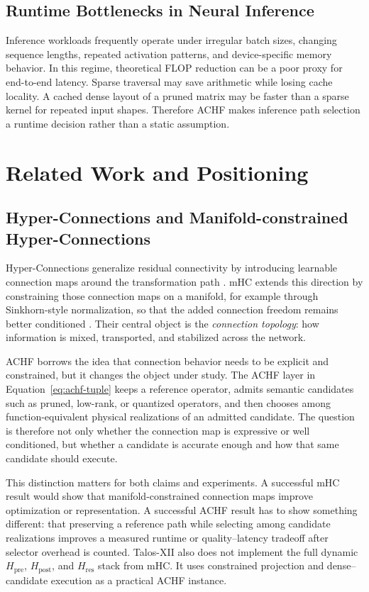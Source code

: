 \documentclass{article}
\newcommand{\achf}{\textsc{ACHF}}
\begin{document}
\subsection{Runtime Bottlenecks in Neural Inference}

Inference workloads frequently operate under irregular batch sizes, changing
sequence lengths, repeated activation patterns, and device-specific memory
behavior. In this regime, theoretical FLOP reduction can be a poor proxy for
end-to-end latency. Sparse traversal may save arithmetic while losing cache
locality. A cached dense layout of a pruned matrix may be faster than a sparse
kernel for repeated input shapes. Therefore \achf{} makes inference path
selection a runtime decision rather than a static assumption.

\section{Related Work and Positioning}
\label{sec:related}

\subsection{Hyper-Connections and Manifold-constrained Hyper-Connections}

Hyper-Connections generalize residual connectivity by introducing learnable
connection maps around the transformation path \cite{hyperconnections2024}.
mHC extends this direction by constraining those connection maps on a manifold,
for example through Sinkhorn-style normalization, so that the added connection
freedom remains better conditioned \cite{mhc2025}. Their central object is the
\emph{connection topology}: how information is mixed, transported, and
stabilized across the network.

\achf{} borrows the idea that connection behavior needs to be explicit and
constrained, but it changes the object under study. The \achf{} layer in
Equation~\eqref{eq:achf-tuple} keeps a reference operator, admits semantic
candidates such as pruned, low-rank, or quantized operators, and then chooses
among function-equivalent physical realizations of an admitted candidate. The
question is therefore not only whether the connection map is expressive or
well conditioned, but whether a candidate is accurate enough and how that same
candidate should execute.

This distinction matters for both claims and experiments. A successful mHC
result would show that manifold-constrained connection maps improve
optimization or representation. A successful \achf{} result has to show something
different: that preserving a reference path while selecting among candidate
realizations improves a measured runtime or quality--latency tradeoff after
selector overhead is counted. Talos-XII also does not implement the full
dynamic $H_{\mathrm{pre}}$, $H_{\mathrm{post}}$, and $H_{\mathrm{res}}$ stack
from mHC. It uses constrained projection and dense--candidate execution as a
practical \achf{} instance.
\end{document}
